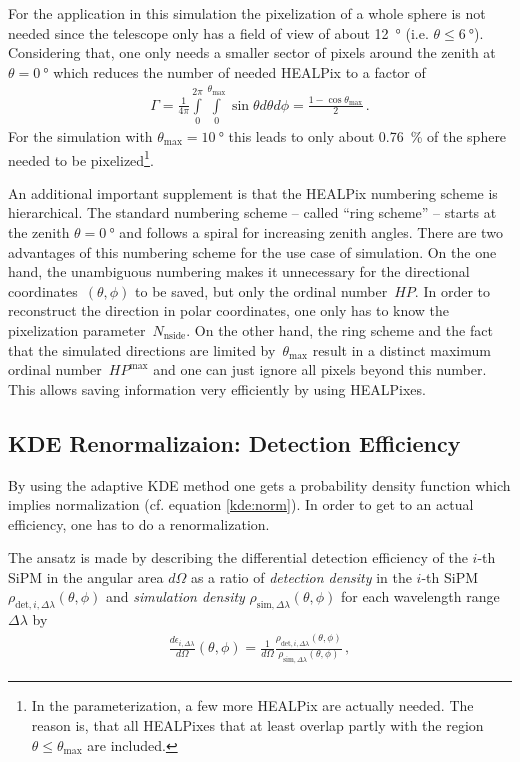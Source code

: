 For the application in this simulation the pixelization of a whole sphere is not needed since the telescope only has a field of view of about \SI{12}{\degree} (i.e. $\theta \leq \SI{6}{\degree}$). Considering that, one only needs a smaller sector of pixels around the zenith at $\theta = \SI{0}{\degree}$ which reduces the number of needed HEALPix to a factor of
\begin{align}
	\Gamma = \frac{1}{4\pi}\int\limits_{0}^{2\pi}\int\limits_{0}^{\theta_\text{max}}\sin{\theta} d\theta d\phi = \frac{1-\cos\theta_\text{max}}{2}\,.
	\label{eq:spherefactor}
\end{align}
For the \iceact simulation with $\theta_\text{max} = \SI{10}{\degree}$ this leads to only about \SI{0.76}{\percent} of the sphere needed to be pixelized\footnote{In the \iceact parameterization, a few more HEALPix are actually needed. The reason is, that all HEALPixes that at least overlap partly with the region $\theta\leq\theta_\text{max}$ are included.}.

An additional important supplement is that the HEALPix numbering scheme is hierarchical. The standard numbering scheme -- called \enquote{ring scheme} -- starts at the zenith $\theta = \SI{0}{\degree}$ and follows a spiral for increasing zenith angles. There are two advantages of this numbering scheme for the use case of \iceact simulation. On the one hand, the unambiguous numbering makes it unnecessary for the directional coordinates~$(\theta, \phi)$ to be saved, but only the ordinal number~$HP$. In order to reconstruct the direction in polar coordinates, one only has to know the pixelization parameter~$N_\text{nside}$. On the other hand, the ring scheme and the fact that the simulated directions are limited by~$\theta_\text{max}$ result in a distinct maximum ordinal number~$HP^\text{max}$ and one can just ignore all pixels beyond this number. This allows saving information very efficiently by using HEALPixes. 

\subsection{KDE Renormalizaion: Detection Efficiency}

By using the adaptive KDE method one gets a probability density function which implies normalization (cf. equation \eqref{kde:norm}). In order to get to an actual efficiency, one has to do a renormalization.

The ansatz is made by describing the differential detection efficiency of the $i$-th SiPM in the angular area $d\Omega$ as a ratio of \textit{detection density} in the $i$-th SiPM $\rho_{\text{det},i,\Delta\lambda}(\theta,\phi)$ and \textit{simulation density} $\rho_{\text{sim},\Delta\lambda}(\theta,\phi)$ for each wavelength range $\Delta\lambda$ by
\begin{align}
\frac{d\epsilon_{i,\Delta\lambda}}{d\Omega}(\theta,\phi) = \frac{1}{d\Omega} \frac{\rho_{\text{det},i,\Delta\lambda}(\theta,\phi)}{\rho_{\text{sim},\Delta\lambda}(\theta,\phi)}\,,
\end{align}

